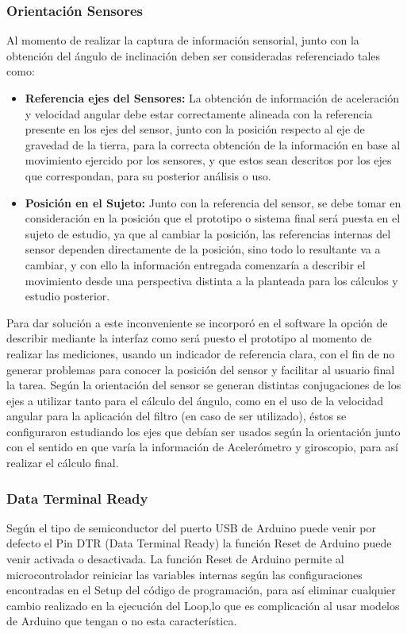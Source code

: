 \documentclass[12pt,a4paper]{article}
\begin{document}
\subsubsection{Orientación Sensores}
Al momento de realizar la captura de información sensorial, junto con la obtención del ángulo de inclinación deben ser consideradas referenciado tales como:
\begin{itemize}
	
	\item \textbf{Referencia ejes del Sensores:} La obtención de información de aceleración y velocidad angular debe estar correctamente alineada con la referencia presente en los ejes del sensor, junto con la posición respecto al eje de gravedad de la tierra, para la correcta obtención de la información en base al movimiento ejercido por los sensores, y que estos sean descritos por los ejes que correspondan, para su posterior análisis o uso.
	
	\item \textbf{Posición en el Sujeto:} Junto con la referencia del sensor, se debe tomar en consideración en la posición que el prototipo o sistema final será puesta en el sujeto de estudio, ya que al cambiar la posición, las referencias internas del sensor dependen directamente de la posición, sino todo lo resultante va a cambiar, y con ello la información entregada comenzaría a describir el movimiento desde una perspectiva distinta a la planteada para los cálculos y estudio posterior.
\end{itemize}

Para dar solución a este inconveniente se incorporó en el software la opción de describir mediante la interfaz como será puesto el prototipo al momento de realizar las mediciones, usando un indicador de referencia clara, con el fin de no generar problemas para conocer la posición del sensor y facilitar al usuario final la tarea.
Según la orientación del sensor se generan distintas conjugaciones de los ejes a utilizar tanto para el cálculo del ángulo, como en el uso de la velocidad angular para la aplicación del filtro (en caso de ser utilizado), éstos se configuraron estudiando los ejes que debían ser usados según la orientación junto con el sentido en que varía la información de Acelerómetro y giroscopio, para así realizar el cálculo final.

\subsubsection{Data Terminal Ready}
Según el tipo de semiconductor del puerto USB de Arduino puede venir por defecto el Pin DTR (Data Terminal Ready) la función Reset de Arduino puede venir activada o desactivada. 
La función Reset de Arduino permite al microcontrolador reiniciar las variables internas según las configuraciones encontradas en el Setup del código de programación, para así eliminar cualquier cambio realizado en la ejecución del Loop,lo que es complicación al usar modelos de Arduino que tengan o no esta característica.
\end{document}
